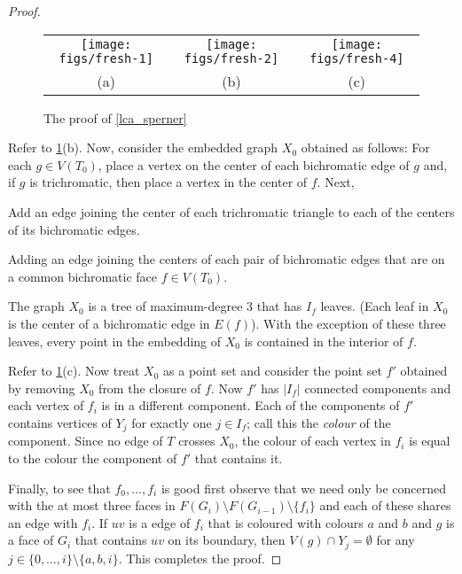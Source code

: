\documentclass{patmorin}
\begin{document}
\begin{proof}
  \begin{figure}
    \begin{center}
      \begin{tabular}{ccc}
        \texttt{[image: figs/fresh-1]} &
        \texttt{[image: figs/fresh-2]} &
        \texttt{[image: figs/fresh-4]} \\
        (a) & (b) & (c)
      \end{tabular}
    \end{center}
    \caption{The proof of \cref{lca_sperner}}
    \label{lca_sperner_fig}
  \end{figure}

  Refer to \cref{lca_sperner_fig}(b).
  Now, consider the embedded graph $X_0$ obtained as follows: For each $g\in V(T_0)$, place a vertex on the center of each bichromatic edge of $g$ and, if $g$ is trichromatic, then place a vertex in the center of $f$.  Next,
   \begin{compactenum}
    \item Add an edge joining the center of each trichromatic triangle to each of the centers of its bichromatic edges.
    \item Adding an edge joining the centers of each pair of bichromatic edges that are on a common bichromatic face $f\in V(T_0)$.
  \end{compactenum}
  The graph $X_0$ is a tree of maximum-degree $3$ that has $I_f$ leaves.  (Each leaf in $X_0$ is the center of a bichromatic edge in $E(f)$).  With the exception of these three leaves, every point in the embedding of $X_0$ is contained in the interior of $f$.

  Refer to \cref{lca_sperner_fig}(c).
  Now treat $X_0$ as a point set and consider the point set $f'$ obtained by removing $X_0$ from the closure of $f$. Now $f'$ has $|I_f|$ connected components and each vertex of $f_i$ is in a different component.  Each of the components of $f'$ contains vertices of $Y_j$ for exactly one $j\in I_f$; call this the \emph{colour} of the component.  Since no edge of $T$ crosses $X_0$, the colour of each vertex in $f_i$ is equal to the colour the component of $f'$ that contains it.

  Finally, to see that $f_0,\ldots,f_i$ is good first observe that we need only be concerned with the at most three faces in $F(G_i)\setminus F(G_{i-1})\setminus\{f_i\}$ and each of these shares an edge with $f_i$.  If $uv$ is a edge of $f_i$ that is coloured with colours $a$ and $b$ and $g$ is a face of $G_i$ that contains $uv$ on its boundary, then $V(g)\cap Y_j=\emptyset$ for any $j\in\{0,\ldots,i\}\setminus\{a, b, i\}$.  This completes the proof.
\end{proof}
\end{document}
